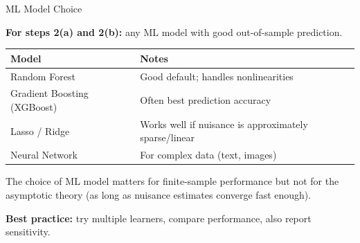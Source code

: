 \documentclass[aspectratio=169, 11pt, handout]{beamer}
\begin{document}
\begin{frame}{ML Model Choice}

\textbf{For steps 2(a) and 2(b):} any ML model with good out-of-sample prediction.

\bigskip

\begin{center}
\begin{tabular}{ll}
\toprule
\textbf{Model} & \textbf{Notes} \\
\midrule
Random Forest & Good default; handles nonlinearities \\
Gradient Boosting (XGBoost) & Often best prediction accuracy \\
Lasso / Ridge & Works well if nuisance is approximately sparse/linear \\
Neural Network & For complex data (text, images) \\
\bottomrule
\end{tabular}
\end{center}

\bigskip
\pause

The choice of ML model matters for finite-sample performance but not for the asymptotic theory (as long as nuisance estimates converge fast enough).

\bigskip

\textbf{Best practice:} try multiple learners, compare performance, also report sensitivity.

\end{frame}
\end{document}
